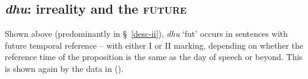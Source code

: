 




\subsection{\textit{dhu}: irreality and the \textsc{future}}

Shown above (predominantly in \S~\ref{desc-ii}),  \textit{dhu} `\gls{fut}' occurs in sentences with future temporal reference -- with either \gls{I} or \gls{II} marking, depending on whether the reference time of the proposition is the same as the day of speech or beyond. This is shown again by the data in ().

